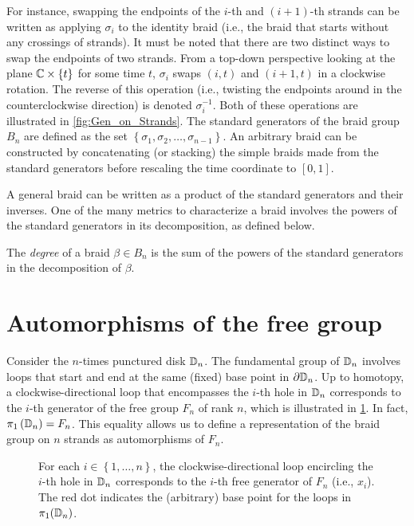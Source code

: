 For instance, swapping the endpoints of the $i$-th and $(i+1)$-th strands can be written as applying $\sigma_i$ to the identity braid (i.e., the braid that starts without any crossings of strands). It must be noted that there are two distinct ways to swap the endpoints of two strands. From a top-down perspective looking at the plane $\mathbb{C}\times\left\{ t \right\}$ for some time $t$, $\sigma_i$ swaps $(i,t)$ and $(i+1,t)$ in a clockwise rotation. The reverse of this operation (i.e., twisting the endpoints around in the counterclockwise direction) is denoted $\sigma_i^{-1}$. Both of these operations are illustrated in \cref{fig:Gen_on_Strands}. The standard generators of the braid group $B_n$ are defined as the set $\left\{ \sigma_1,\sigma_2,\dots,\sigma_{n-1} \right\}$. An arbitrary braid can be constructed by concatenating (or stacking) the simple braids made from the standard generators before rescaling the time coordinate to $[0,1]$.

A general braid can be written as a product of the standard generators and their inverses. One of the many metrics to characterize a braid involves the powers of the standard generators in its decomposition, as defined below.
\begin{definition}
    The \textit{degree} of a braid $\beta\in B_n$ is the sum of the powers of the standard generators in the decomposition of $\beta$.
\end{definition}

\section{Automorphisms of the free group}\label{sec:Aut_Fn}

Consider the $n$-times punctured disk $\mathbb{D}_n$. The fundamental group of $\mathbb{D}_n$ involves loops that start and end at the same (fixed) base point in $\partial\mathbb{D}_n$. Up to homotopy, a clockwise-directional loop that encompasses the $i$-th hole in $\mathbb{D}_n$ corresponds to the $i$-th generator of the free group $F_n$ of rank $n$, which is illustrated in \cref{fig:Gen_on_Dn}. In fact, $\pi_1\left( \mathbb{D}_n \right) = F_n$. This equality allows us to define a representation of the braid group on $n$ strands as automorphisms of $F_n$.

\begin{figure}[htbp]
    \centering
    
    \caption{For each $i\in\left\{ 1,\dots,n \right\}$, the clockwise-directional loop encircling the $i$-th hole in $\mathbb{D}_n$ corresponds to the $i$-th free generator of $F_n$ (i.e., $x_i$). The red dot indicates the (arbitrary) base point for the loops in $\pi_1(\mathbb{D}_n)$.}\label{fig:Gen_on_Dn}
\end{figure}

